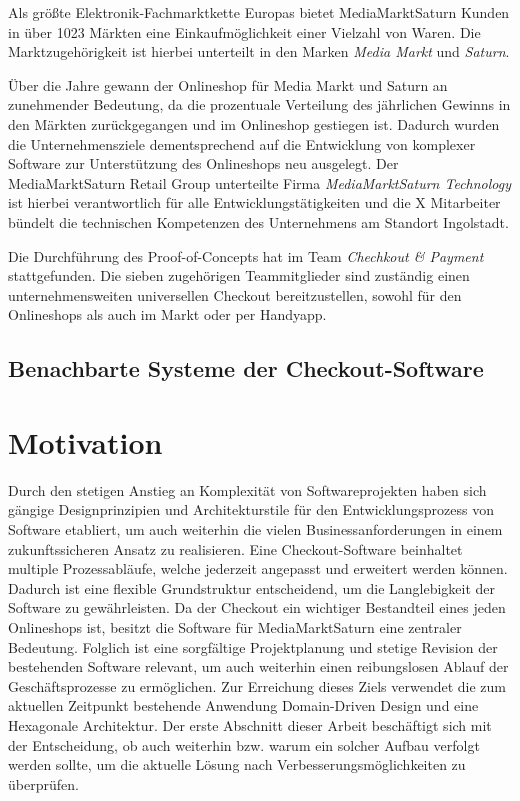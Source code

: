 Als größte Elektronik-Fachmarktkette Europas bietet MediaMarktSaturn Kunden in über 1023 Märkten eine Einkaufmöglichkeit einer Vielzahl von Waren. Die Marktzugehörigkeit ist hierbei unterteilt in den Marken \emph{Media Markt} und \emph{Saturn}. %

Über die Jahre gewann der Onlineshop für Media Markt und Saturn an zunehmender Bedeutung, da die prozentuale Verteilung des jährlichen Gewinns in den Märkten zurückgegangen und im Onlineshop gestiegen ist. Dadurch wurden die Unternehmensziele dementsprechend auf die Entwicklung von komplexer Software zur Unterstützung des Onlineshops neu ausgelegt. Der MediaMarktSaturn Retail Group unterteilte Firma \emph{MediaMarktSaturn Technology} ist hierbei verantwortlich für alle Entwicklungstätigkeiten und die {\color{red}X} Mitarbeiter bündelt die technischen Kompetenzen des Unternehmens am Standort Ingolstadt. %

Die Durchführung des Proof-of-Concepts hat im Team \emph{Chechkout \& Payment} stattgefunden. Die sieben zugehörigen Teammitglieder sind zuständig einen unternehmensweiten universellen Checkout bereitzustellen, sowohl für den Onlineshops als auch im Markt oder per Handyapp. %

\subsection{Benachbarte Systeme der Checkout-Software}

\section{Motivation}


Durch den stetigen Anstieg an Komplexität von Softwareprojekten haben sich gängige Designprinzipien und Architekturstile für den Entwicklungsprozess von Software etabliert, um auch weiterhin die vielen Businessanforderungen in einem zukunftssicheren Ansatz zu realisieren. Eine Checkout-Software beinhaltet multiple Prozessabläufe, welche jederzeit angepasst und erweitert werden können. Dadurch ist eine flexible Grundstruktur entscheidend, um die Langlebigkeit der Software zu gewährleisten. Da der Checkout ein wichtiger Bestandteil eines jeden Onlineshops ist, besitzt die Software für MediaMarktSaturn eine zentraler Bedeutung. Folglich ist eine sorgfältige Projektplanung und stetige Revision der bestehenden Software relevant, um auch weiterhin einen reibungslosen Ablauf der Geschäftsprozesse zu ermöglichen. Zur Erreichung dieses Ziels verwendet die zum aktuellen Zeitpunkt bestehende Anwendung Domain-Driven Design und eine Hexagonale Architektur. Der erste Abschnitt dieser Arbeit beschäftigt sich mit der Entscheidung, ob auch weiterhin bzw. warum ein solcher Aufbau verfolgt werden sollte, um die aktuelle Lösung nach Verbesserungsmöglichkeiten zu überprüfen. 

